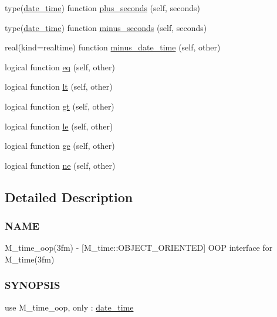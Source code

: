 \begin{DoxyCompactItemize}
type(\mbox{\hyperlink{structm__time__oop_1_1date__time}{date\+\_\+time}}) function \mbox{\hyperlink{namespacem__time__oop_a6830c1cce303ec401ac8e4333a5a73d4}{plus\+\_\+seconds}} (self, seconds)
\item 
type(\mbox{\hyperlink{structm__time__oop_1_1date__time}{date\+\_\+time}}) function \mbox{\hyperlink{namespacem__time__oop_a395fbf19c6617641aea39c33fd4b2087}{minus\+\_\+seconds}} (self, seconds)
\item 
real(kind=realtime) function \mbox{\hyperlink{namespacem__time__oop_a3da83a42a8f957db9bd2f6f0b942ab99}{minus\+\_\+date\+\_\+time}} (self, other)
\item 
logical function \mbox{\hyperlink{namespacem__time__oop_afcc34853af3eda020eb5ff802e04964d}{eq}} (self, other)
\item 
logical function \mbox{\hyperlink{namespacem__time__oop_ab0c5ce86d25993804501d59a8106818f}{lt}} (self, other)
\item 
logical function \mbox{\hyperlink{namespacem__time__oop_a753692f18b6cd100401603d0b88d7c3c}{gt}} (self, other)
\item 
logical function \mbox{\hyperlink{namespacem__time__oop_a5e04ff772ac6d72f68031ec43c1e6c84}{le}} (self, other)
\item 
logical function \mbox{\hyperlink{namespacem__time__oop_aeea1131ab511b897168f00a908b75458}{ge}} (self, other)
\item 
logical function \mbox{\hyperlink{namespacem__time__oop_a7707a7cbd4869301a613ceeb12ed2384}{ne}} (self, other)
\end{DoxyCompactItemize}


\subsection{Detailed Description}
\subsubsection*{N\+A\+ME}

M\+\_\+time\+\_\+oop(3fm) -\/ \mbox{[}M\+\_\+time\+::\+O\+B\+J\+E\+C\+T\+\_\+\+O\+R\+I\+E\+N\+T\+ED\mbox{]} O\+OP interface for M\+\_\+time(3fm) 

\subsubsection*{S\+Y\+N\+O\+P\+S\+IS}

use M\+\_\+time\+\_\+oop, only \+: \mbox{\hyperlink{structm__time__oop_1_1date__time}{date\+\_\+time}}

